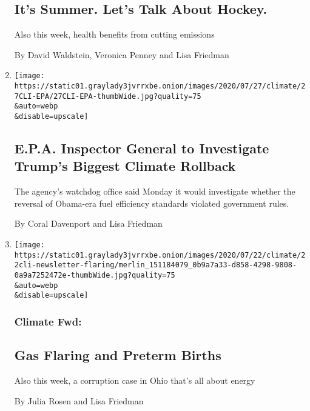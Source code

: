 \begin{enumerate}
  \hypertarget{its-summer-lets-talk-about-hockey}{%
  \subsection{It's Summer. Let's Talk About
  Hockey.}\label{its-summer-lets-talk-about-hockey}}

  Also this week, health benefits from cutting emissions

  By David Waldstein, Veronica Penney and Lisa Friedman
\item
  \href{/2020/07/27/climate/trump-fuel-efficiency-rule.html}{}

  \texttt{[image: https://static01.graylady3jvrrxbe.onion/images/2020/07/27/climate/27CLI-EPA/27CLI-EPA-thumbWide.jpg?quality=75\\\&auto=webp\\\&disable=upscale]}

  \hypertarget{epa-inspector-general-to-investigate-trumps-biggest-climate-rollback}{%
  \subsection{E.P.A. Inspector General to Investigate Trump's Biggest
  Climate
  Rollback}\label{epa-inspector-general-to-investigate-trumps-biggest-climate-rollback}}

  The agency's watchdog office said Monday it would investigate whether
  the reversal of Obama-era fuel efficiency standards violated
  government rules.

  By Coral Davenport and Lisa Friedman
\item
  \href{/2020/07/22/climate/nyt-climate-newsletter-premature-babies.html}{}

  \texttt{[image: https://static01.graylady3jvrrxbe.onion/images/2020/07/22/climate/22cli-newsletter-flaring/merlin\_151184079\_0b9a7a33-d858-4298-9808-0a9a7252472e-thumbWide.jpg?quality=75\\\&auto=webp\\\&disable=upscale]}

  \hypertarget{climate-fwd-2}{%
  \subsubsection{Climate Fwd:}\label{climate-fwd-2}}

  \hypertarget{gas-flaring-and-preterm-births}{%
  \subsection{Gas Flaring and Preterm
  Births}\label{gas-flaring-and-preterm-births}}

  Also this week, a corruption case in Ohio that's all about energy

  By Julia Rosen and Lisa Friedman
\end{enumerate}

